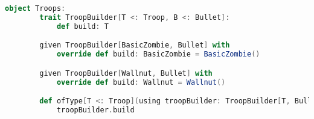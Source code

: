 \begin{lstlisting}[language=Scala, label=code:troop-builder, caption= Builder per la creazione di una Troop.]
    object Troops:
        trait TroopBuilder[T <: Troop, B <: Bullet]:
            def build: T

        given TroopBuilder[BasicZombie, Bullet] with
            override def build: BasicZombie = BasicZombie()

        given TroopBuilder[Wallnut, Bullet] with
            override def build: Wallnut = Wallnut()

        def ofType[T <: Troop](using troopBuilder: TroopBuilder[T, Bullet]): T =
            troopBuilder.build
\end{lstlisting}